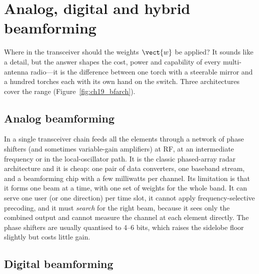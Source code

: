 
\section{Analog, digital and hybrid beamforming}
\label{sec:ch19:hybrid}

Where in the transceiver should the weights $\vect{w}$ be applied? It sounds like a detail, but the
answer shapes the cost, power and capability of every multi-antenna radio---it is the difference
between one torch with a steerable mirror and a hundred torches each with its own hand on the
switch. Three architectures cover the range (Figure~\ref{fig:ch19_bfarch}).

\subsection{Analog beamforming}

In  a single transceiver chain feeds all the elements through a network of
phase shifters (and sometimes variable-gain amplifiers) at RF, at an intermediate frequency or in
the local-oscillator path. It is the classic phased-array radar architecture and it is cheap:
one pair of data converters, one baseband stream, and a beamforming chip with a few milliwatts per
channel. Its limitation is that it forms one beam at a time, with one set of weights for the whole
band. It can serve one user (or one direction) per time slot, it cannot apply frequency-selective
precoding, and it must \emph{search} for the right beam, because it sees only the combined output
and cannot measure the channel at each element directly. The phase shifters are usually quantised
to 4--6 bits, which raises the sidelobe floor slightly but costs little gain.

\subsection{Digital beamforming}

